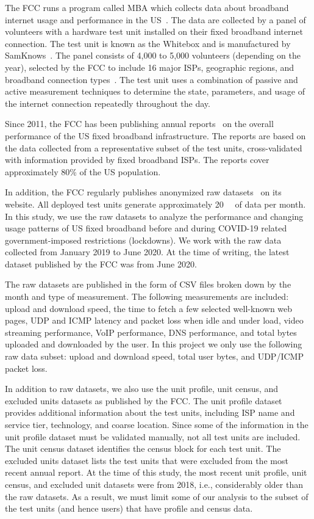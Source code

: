 \documentclass[conference,10pt]{IEEEtran}
\begin{document}
The \gls{FCC} runs a program called \gls{MBA} which collects data about broadband internet usage and performance in the \gls{US}~\cite{mba}. The data are collected by a panel of volunteers with a hardware test unit installed on their fixed broadband internet connection. The test unit is known as the Whitebox and is manufactured by SamKnows~\cite{sam}. The panel consists of 4,000 to 5,000 volunteers (depending on the year), selected by the \gls{FCC} to include 16 major \glspl{ISP}, geographic regions, and broadband connection types~\cite{fcc-report-appendix}. The test unit uses a combination of passive and active measurement techniques to determine the state, parameters, and usage of the internet connection repeatedly throughout the day.

Since 2011, the \gls{FCC} has been publishing annual reports~\cite{mba-studies} on the overall performance of the \gls{US} fixed broadband infrastructure. The reports are based on the data collected from a representative subset of the test units, cross-validated with information provided by fixed broadband \glspl{ISP}. The reports cover approximately 80\% of the \gls{US} population.

In addition, the \gls{FCC} regularly publishes anonymized raw datasets~\cite{data} on its website. All deployed test units generate approximately \SI{20}{\giga\byte} of data per month. In this study, we use the raw datasets to analyze the performance and changing usage patterns of \gls{US} fixed broadband before and during COVID-19 related government-imposed restrictions (lockdowns). We work with the raw data collected from January 2019 to June 2020. At the time of writing, the latest dataset published by the \gls{FCC} was from June 2020.

The raw datasets are published in the form of \gls{CSV} files broken down by the month and type of measurement. The following measurements are included: upload and download speed, the time to fetch a few selected well-known web pages, \gls{UDP} and \gls{ICMP} latency and packet loss when idle and under load, video streaming performance, \gls{VoIP} performance, \gls{DNS} performance, and total bytes uploaded and downloaded by the user. In this project we only use the following raw data subset: upload and download speed, total user bytes, and \gls{UDP}/\gls{ICMP} packet loss.

In addition to raw datasets, we also use the unit profile, unit census, and excluded units datasets as published by the \gls{FCC}. The unit profile dataset provides additional information about the test units, including \gls{ISP} name and service tier, technology, and coarse location. Since some of the information in the unit profile dataset must be validated manually, not all test units are included. The unit census dataset identifies the census block for each test unit. The excluded units dataset lists the test units that were excluded from the most recent annual report. At the time of this study, the most recent unit profile, unit census, and excluded unit datasets were from 2018, i.e., considerably older than the raw datasets. As a result, we must limit some of our analysis to the subset of the test units (and hence users) that have profile and census data.
\end{document}
